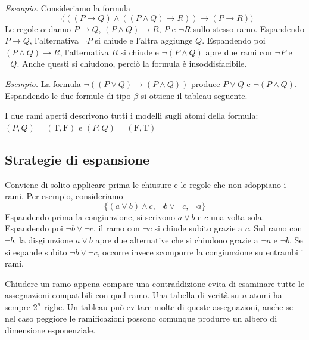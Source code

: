 \medskip
\noindent
\textit{Esempio.} Consideriamo la formula
\[
    \neg\bigl(((P\to Q)\wedge((P\wedge Q)\to R))\to(P\to R)\bigr)
\]
Le regole $\alpha$ danno $P\to Q$, $(P\wedge Q)\to R$, $P$ e
$\neg R$ sullo stesso ramo. Espandendo $P\to Q$, l'alternativa
$\neg P$ si chiude e l'altra aggiunge $Q$. Espandendo poi
$(P\wedge Q)\to R$, l'alternativa $R$ si chiude e
$\neg(P\wedge Q)$ apre due rami con $\neg P$ e $\neg Q$.
Anche questi si chiudono, perciò la formula è insoddisfacibile.

\medskip
\noindent
\textit{Esempio.} La formula $\neg((P\vee Q)\to(P\wedge Q))$
produce $P\vee Q$ e $\neg(P\wedge Q)$. Espandendo le due
formule di tipo $\beta$ si ottiene il tableau seguente.

\begin{center}
\end{center}

\noindent
I due rami aperti descrivono tutti i modelli sugli atomi della
formula: $(P,Q)=(\mathrm{T},\mathrm{F})$ e
$(P,Q)=(\mathrm{F},\mathrm{T})$

\subsection{Strategie di espansione}
Conviene di solito applicare prima le chiusure e le regole
che non sdoppiano i rami. Per esempio, consideriamo
\[
    \{(a\vee b)\wedge c,\ \neg b\vee\neg c,\ \neg a\}
\]
Espandendo prima la congiunzione, si scrivono $a\vee b$ e $c$
una volta sola. Espandendo poi $\neg b\vee\neg c$, il ramo con
$\neg c$ si chiude subito grazie a $c$. Sul ramo con $\neg b$,
la disgiunzione $a\vee b$ apre due alternative che si chiudono
grazie a $\neg a$ e $\neg b$. Se si espande subito
$\neg b\vee\neg c$, occorre invece scomporre la congiunzione
su entrambi i rami.

\medskip
\noindent
Chiudere un ramo appena compare una contraddizione evita di
esaminare tutte le assegnazioni compatibili con quel ramo.
Una tabella di verità su $n$ atomi ha sempre $2^n$ righe.
Un tableau può evitare molte di queste assegnazioni, anche se
nel caso peggiore le ramificazioni possono comunque produrre
un albero di dimensione esponenziale.

